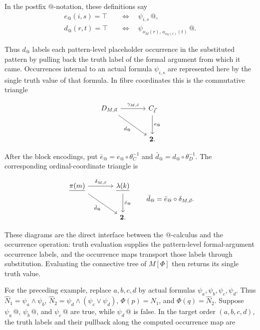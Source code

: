 \documentclass[11pt]{article}
\makeatletter
\newcommand{\atsign}{\mathord{@}}
\newcommand{\finord}[1]{\underline{#1}}
\theoremstyle{definition}
\makeatother
\begin{document}
In the postfix \(\atsign\)-notation, these definitions say
\[
\begin{aligned}
e_{\atsign}(i,s)=\top
&\quad\Longleftrightarrow\quad \psi_{i,s}\,\atsign,\\
d_{\atsign}(r,t)=\top
&\quad\Longleftrightarrow\quad
\psi_{o_M(r),\,o_{o_M(r)}(t)}\,\atsign.
\end{aligned}
\]

Thus \(d_{\atsign}\) labels each pattern-level placeholder occurrence in the
substituted pattern by pulling back the truth label of the formal argument from
which it came. Occurrences internal to an actual formula \(\psi_{i,s}\) are
represented here by the single truth value of that formula. In fibre
coordinates this is the commutative triangle

\[
\begin{tikzcd}[row sep=large,column sep=large]
D_{M,\vec n} \arrow[r,"\gamma_{M,\vec o}"]
  \arrow[dr,"d_{\atsign}"'] &
C_{\vec\ell} \arrow[d,"e_{\atsign}"] \\
& \mathbf 2.
\end{tikzcd}
\]

After the block encodings, put
\(\bar e_{\atsign}=e_{\atsign}\circ\theta_C^{-1}\) and
\(\bar d_{\atsign}=d_{\atsign}\circ\theta_D^{-1}\). The corresponding
ordinal-coordinate triangle is

\[
\begin{tikzcd}[row sep=large,column sep=large]
\finord{\pi(m)} \arrow[r,"\delta_{M,\vec o}"]
  \arrow[dr,"\bar d_{\atsign}"'] &
\finord{\lambda(k)} \arrow[d,"\bar e_{\atsign}"] \\
& \mathbf 2.
\end{tikzcd}
\qquad
\bar d_{\atsign}=\bar e_{\atsign}\circ\delta_{M,\vec o}.
\]

These diagrams are the direct interface between the \(\atsign\)-calculus and
the occurrence operation: truth evaluation supplies the pattern-level
formal-argument occurrence labels, and the
occurrence maps transport those labels through substitution. Evaluating the
connective tree of \(M[\Phi]\) then returns its single truth value.

For the preceding example, replace \(a,b,c,d\) by actual formulas
\(\psi_a,\psi_b,\psi_c,\psi_d\). Thus
\(\widehat N_1=\psi_a\wedge\psi_b\),
\(\widehat N_2=\psi_d\wedge(\psi_c\vee\psi_d)\),
\(\Phi(p)=\widehat N_1\), and \(\Phi(q)=\widehat N_2\). Suppose
\(\psi_a\,\atsign\), \(\psi_b\,\atsign\), and
\(\psi_c\,\atsign\) are true, while \(\psi_d\,\atsign\) is false. In the
target order \((a,b,c,d)\), the truth labels and their pullback along the
computed occurrence map are
\end{document}
